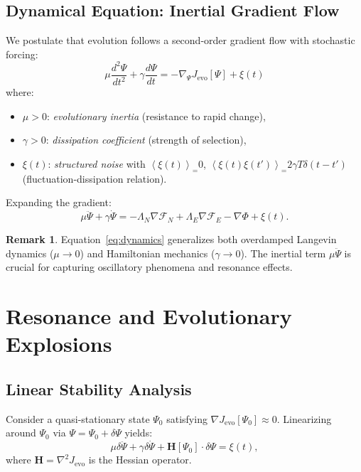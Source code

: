 \documentclass[11pt,a4paper]{article}
\theoremstyle{plain}
\theoremstyle{definition}
\newtheorem{remark}[theorem]{Remark}
\theoremstyle{remark}
\newcommand{\Foam}{\Phi}
\newcommand{\Functional}{\mathcal{F}}
\newcommand{\grad}{\nabla}
\newcommand{\expect}[2]{\left\langle#1\right\rangle_{#2}}
\begin{document}
\subsection{Dynamical Equation: Inertial Gradient Flow}

We postulate that evolution follows a second-order gradient flow with stochastic forcing:
\begin{equation}
\boxed{
\mu \frac{d^2\Psi}{dt^2} + \gamma \frac{d\Psi}{dt} = -\grad_{\Psi} J_{\text{evo}}[\Psi] + \xi(t)
}
\label{eq:dynamics}
\end{equation}
where:
\begin{itemize}
    \item $\mu > 0$: \textit{evolutionary inertia} (resistance to rapid change),
    \item $\gamma > 0$: \textit{dissipation coefficient} (strength of selection),
    \item $\xi(t)$: \textit{structured noise} with $\expect{\xi(t)} = 0$, $\expect{\xi(t)\xi(t')} = 2\gamma T \delta(t-t')$ (fluctuation-dissipation relation).
\end{itemize}

Expanding the gradient:
\begin{equation}
\mu \ddot{\Psi} + \gamma \dot{\Psi} = -\Lambda_N \grad\Functional_N + \Lambda_E \grad\Functional_E - \grad\Foam + \xi(t).
\label{eq:dynamics_expanded}
\end{equation}

\begin{remark}
Equation~\eqref{eq:dynamics} generalizes both overdamped Langevin dynamics ($\mu \to 0$) and Hamiltonian mechanics ($\gamma \to 0$). The inertial term $\mu \ddot{\Psi}$ is crucial for capturing oscillatory phenomena and resonance effects.
\end{remark}

\section{Resonance and Evolutionary Explosions}
\label{sec:resonance}

\subsection{Linear Stability Analysis}

Consider a quasi-stationary state $\Psi_0$ satisfying $\grad J_{\text{evo}}[\Psi_0] \approx 0$. Linearizing around $\Psi_0$ via $\Psi = \Psi_0 + \delta\Psi$ yields:
\begin{equation}
\mu \delta\ddot{\Psi} + \gamma \delta\dot{\Psi} + \mathbf{H}[\Psi_0] \cdot \delta\Psi = \xi(t),
\label{eq:linearized}
\end{equation}
where $\mathbf{H} = \grad^2 J_{\text{evo}}$ is the Hessian operator.
\end{document}
